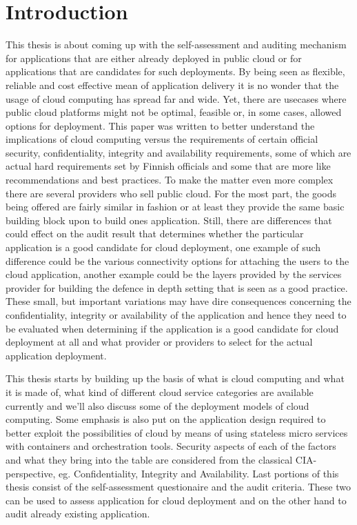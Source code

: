 \documentclass{article}
\begin{document}
\section{Introduction}
This thesis is about coming up with the self-assessment and auditing mechanism for applications that are either already deployed in public cloud or for applications that are candidates for such deployments. By being seen as flexible, reliable and cost effective mean of application delivery it is no wonder that the usage of cloud computing has spread far and wide.
Yet, there are usecases where public cloud platforms might not be optimal, feasible or, in some cases, allowed options for deployment. This paper was written to better understand the implications of cloud computing versus the requirements of certain official security, confidentiality, integrity and availability requirements, some of which are actual hard requirements set by Finnish officials and some that are more like recommendations and best practices. To make the matter even more complex there are several providers who sell public cloud. For the most part, the goods being offered are fairly similar in fashion or at least they provide the same basic building block upon to build ones application. Still, there are differences that could effect on the audit result that determines whether the particular application is a good candidate for cloud deployment, one example of such difference could be the various connectivity options for attaching the users to the cloud application, another example could be the layers provided by the services provider for building the defence in depth setting that is seen as a good practice. These small, but important variations may have dire consequences concerning the confidentiality, integrity or availability of the application and hence they need to be evaluated when determining if the application is a good candidate for cloud deployment at all and what provider or providers to select for the actual application deployment.
\par
This thesis starts by building up the basis of what is cloud computing and what it is made of, what kind of different cloud service categories are available currently and we'll also discuss some of the deployment models of cloud computing. Some emphasis is also put on the application design required to better exploit the possibilities of cloud by means of using stateless micro services with containers and orchestration tools. Security aspects of each of the factors and what they bring into the table are considered from the classical CIA-perspective, eg. Confidentiality, Integrity and Availability. Last portions of this thesis consist of the self-assessment questionaire and the audit criteria. These two can be used to assess application for cloud deployment and on the other hand to audit already existing application.
\end{document}
